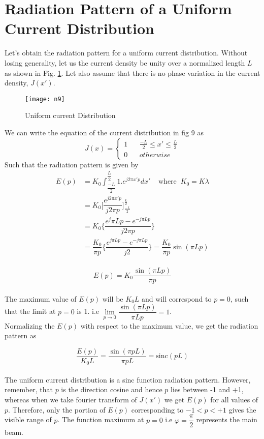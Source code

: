 \section{Radiation Pattern of a Uniform Current Distribution}
Let's obtain the radiation pattern for a uniform current distribution. Without losing generality, let us the current density be unity over a normalized length $L$ as shown in Fig. \ref{fig9}. Let also assume that there is no phase variation in the current density, $J(x')$.
\begin{figure}[h]
	\centering
	\texttt{[image: n9]}
	\caption{Uniform current Distribution}
	\label{fig9}
\end{figure}
We can write the equation of the current distribution in fig 9 as\\
\begin{equation*}
J(x) =
\begin{cases}
1 \ \ \ \ & \frac{-L}{2}\le x' \le \frac{L}{2} \\
0  & otherwise
\end{cases}
\end{equation*}
Such that the radiation pattern is given by \\
\begin{align*}E(p) &= K_0\int_{\dfrac{-L}{2}}^{\dfrac{L}{2}} 1.e^{j2\pi x'p }dx' \; \; \; \;\text{where}\; \;  K_0 = K\lambda\\ %
&= K_0\bigg[\dfrac{e^{j2\pi x'p}}{j2\pi p}\bigg]_{\frac{-L}{2}}^{ \frac{L}{2}}\\	  
&= K_0 \bigg\{\dfrac{ e{^j\pi Lp}- e^{-j\pi Lp}}{j2\pi p}\bigg\}\\
& = \dfrac{K_0}{\pi p}\bigg\{\dfrac{ e^{j\pi Lp} -  e^{-j\pi Lp}}{j2}\bigg\} = \dfrac{K_0}{\pi p}\sin(\pi Lp)\end{align*}
\\
$$E(p) = K_0 \dfrac{\sin (\pi Lp)}{\pi p}$$\\
The maximum value of $E(p)$ will be $K_0L$ and will correspond to $ p = 0$, such that the limit at $p = 0$ is 1. i.e $\lim\limits_{p\rightarrow0} \dfrac{\sin(\pi Lp)}{\pi Lp} = 1$.\\
Normalizing the $E(p)$ with respect to the maximum value, we get the radiation pattern as

\begin{equation}
\dfrac{E(p)}{K_0 L} = \dfrac{\sin(\pi pL)}{\pi pL} = \text{sinc}(pL)
\end{equation}
\\
The uniform current distribution is a sinc function radiation pattern. However, remember, that $p$ is the direction cosine and hence $p$ lies between -1 and +1, whereas when we take fourier transform of $J(x')$ we get $E(p)$ for all values of $p$. Therefore, only the portion of $E(p)$ corresponding to $-1 < p < +1$ gives the visible range of $p$. The function maximum at $p = 0$ i.e $\varphi = \dfrac{\pi}{2}$ represents the main beam.


